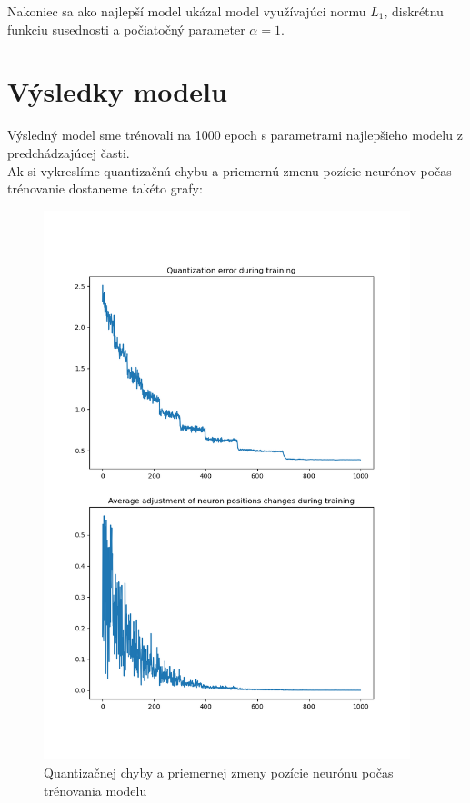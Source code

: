 \documentclass[a4paper]{article}
\begin{document}
	Nakoniec sa ako najlepší model ukázal model využívajúci normu $L_1$, diskrétnu funkciu susednosti a počiatočný parameter $\alpha=1$.
	
	\section{Výsledky modelu}
	
	Výsledný model sme trénovali na 1000 epoch s parametrami najlepšieho modelu z predchádzajúcej časti.
	\\
	
	Ak si vykreslíme quantizačnú chybu a priemernú zmenu pozície neurónov počas trénovanie dostaneme takéto grafy:
	\newpage

	\begin{figure}[!h]
		\centering
		\includegraphics[width=0.95\textwidth]{../errors.png}
		\caption{Quantizačnej chyby a priemernej zmeny pozície neurónu počas trénovania modelu }
	\end{figure}
	
\end{document}
